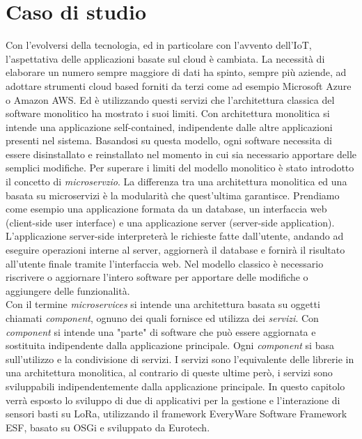 \chapter{Caso di studio}
Con l'evolversi della tecnologia, ed in particolare con l'avvento dell'IoT,
l'aspettativa delle applicazioni basate sul cloud è cambiata. La necessità di
elaborare un numero sempre maggiore di dati ha spinto, sempre più aziende, ad
adottare strumenti cloud based forniti da terzi come ad esempio Microsoft Azure o Amazon
AWS.  Ed è utilizzando questi servizi  che l'architettura classica del
software monolitico ha mostrato i suoi limiti. Con architettura monolitica si
intende una applicazione self-contained, indipendente dalle altre
applicazioni presenti nel sistema.  Basandosi su questa modello, ogni
software necessita di essere disinstallato e reinstallato nel momento in cui
sia necessario apportare delle semplici modifiche. Per superare i limiti del
modello monolitico è stato introdotto il concetto di 
\emph{microservzio}.  La differenza tra una architettura monolitica ed una
basata su microservizi è la  modularità che quest'ultima garantisce.  Prendiamo
come esempio una applicazione formata da un database, un interfaccia web
(client-side user interface)  e una applicazione server (server-side
application).  L'applicazione server-side interpreterà le richieste fatte
dall'utente, andando ad eseguire operazioni interne al server, aggiornerà il
database e fornirà il risultato all'utente finale tramite l'interfaccia web.
Nel modello classico  è necessario riscrivere o aggiornare l'intero 
software per apportare delle modifiche o aggiungere delle funzionalità.\\ 
Con il termine \emph{microservices}
si intende una architettura basata su oggetti chiamati \emph{component}, ognuno
dei quali fornisce ed utilizza dei \emph{servizi}. Con \textit{component} si intende
una "parte" di software che può essere aggiornata e sostituita indipendente
dalla applicazione principale.  Ogni \emph{component} si basa sull'utilizzo e la
condivisione di servizi.  I servizi sono l'equivalente delle librerie in una
architettura monolitica, al contrario di queste ultime però, i servizi sono
sviluppabili indipendentemente dalla applicazione principale.
In questo capitolo verrà esposto lo sviluppo di due 
 di applicativi per la gestione e l'interazione di sensori
basti su LoRa, utilizzando il framework EveryWare Software Framework ESF,
basato su OSGi e sviluppato da Eurotech.
